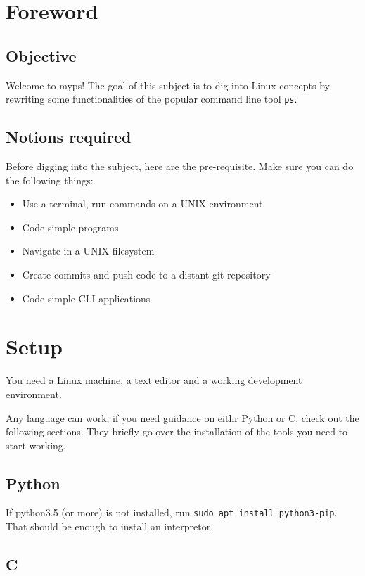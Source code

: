 \documentclass[12pt]{article}
\begin{document}
\section{Foreword}
\subsection{Objective}

Welcome to myps!
The goal of this subject is to dig into Linux concepts by rewriting some functionalities of the popular command line tool \texttt{ps}.

\subsection{Notions required}

Before digging into the subject, here are the pre-requisite. Make sure you can do the following things:

\begin{itemize}
\item Use a terminal, run commands on a UNIX environment
\item Code simple programs
\item Navigate in a UNIX filesystem
\item Create commits and push code to a distant git repository
\item Code simple CLI applications
\end{itemize}


\section{Setup}

You need a Linux machine, a text editor and a working development environment.

Any language can work; if you need guidance on eithr Python or C, check out the following sections. They briefly go over the installation of the tools you need to start working.

\subsection{Python}

If python3.5 (or more) is not installed, run \texttt{sudo apt install python3-pip}. That should be enough to install an interpretor.

\subsection{C}
\end{document}

